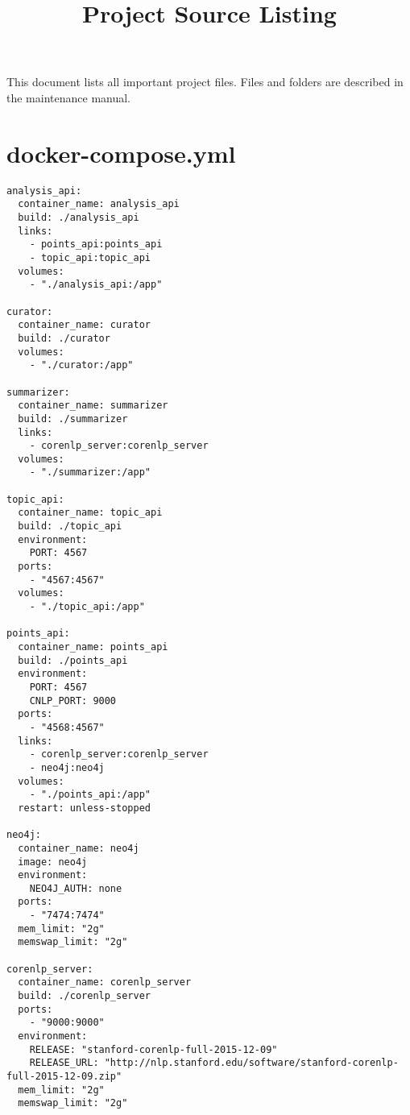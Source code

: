 \documentclass{article}
\title{Project Source Listing}
\date{}
\begin{document}
  \maketitle
  This document lists all important project files. Files and folders are described in the maintenance manual.
  \pagebreak


\section*{docker-compose.yml}
\begin{verbatim}
analysis_api:
  container_name: analysis_api
  build: ./analysis_api
  links:
    - points_api:points_api
    - topic_api:topic_api
  volumes:
    - "./analysis_api:/app"

curator:
  container_name: curator
  build: ./curator
  volumes:
    - "./curator:/app"

summarizer:
  container_name: summarizer
  build: ./summarizer
  links:
    - corenlp_server:corenlp_server
  volumes:
    - "./summarizer:/app"

topic_api:
  container_name: topic_api
  build: ./topic_api
  environment:
    PORT: 4567
  ports:
    - "4567:4567"
  volumes:
    - "./topic_api:/app"

points_api:
  container_name: points_api
  build: ./points_api
  environment:
    PORT: 4567
    CNLP_PORT: 9000
  ports:
    - "4568:4567"
  links:
    - corenlp_server:corenlp_server
    - neo4j:neo4j
  volumes:
    - "./points_api:/app"
  restart: unless-stopped

neo4j:
  container_name: neo4j
  image: neo4j
  environment:
    NEO4J_AUTH: none
  ports:
    - "7474:7474"
  mem_limit: "2g"
  memswap_limit: "2g"

corenlp_server:
  container_name: corenlp_server
  build: ./corenlp_server
  ports:
    - "9000:9000"
  environment:
    RELEASE: "stanford-corenlp-full-2015-12-09"
    RELEASE_URL: "http://nlp.stanford.edu/software/stanford-corenlp-full-2015-12-09.zip"
  mem_limit: "2g"
  memswap_limit: "2g"


\end{verbatim}
\pagebreak
\end{document}
